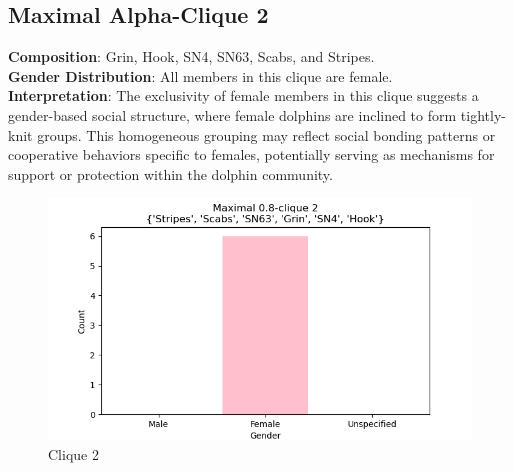 \subsection{Maximal Alpha-Clique 2}
\textbf{Composition}: Grin, Hook, SN4, SN63, Scabs, and Stripes. \\
\textbf{Gender Distribution}: All members in this clique are female. \\
\textbf{Interpretation}: The exclusivity of female members in this clique suggests a gender-based social structure, where female dolphins are inclined to form tightly-knit groups. This homogeneous grouping may reflect social bonding patterns or cooperative behaviors specific to females, potentially serving as mechanisms for support or protection within the dolphin community.
\begin{figure}[H]
    \centering
    \includegraphics[width=1.0\textwidth]{imgs/clique_2.png}
    \caption{Clique 2}
    \label{fig:clique_2}
\end{figure}

